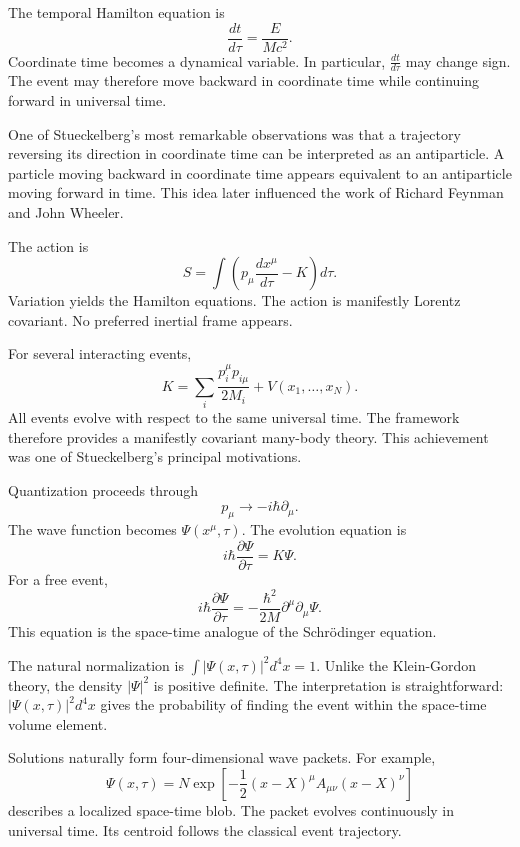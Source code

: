 The temporal Hamilton equation is
    \[\frac{dt}{d\tau} = \frac{E}{Mc^2}.\]
Coordinate time becomes a dynamical variable.
In particular, $\frac{dt}{d\tau}$ may change sign.
The event may therefore move backward in coordinate time while continuing 
forward in universal time.

One of Stueckelberg's most remarkable observations was that a trajectory 
reversing its direction in coordinate time can be interpreted as an antiparticle.
A particle moving backward in coordinate time appears equivalent to an 
antiparticle moving forward in time.
This idea later influenced the work of Richard Feynman and John Wheeler.

The action is
\begin{equation}
    \label{shp-a}
S=\int\left(p_\mu \frac{dx^\mu}{d\tau}-K\right)d\tau.
\end{equation}
Variation yields the Hamilton equations.
The action is manifestly Lorentz covariant.
No preferred inertial frame appears.

For several interacting events,
\begin{equation}
    \label{shp-hint}
K = \sum_i \frac{p_i^\mu p_{i\mu}}{2M_i}+V(x_1,\ldots,x_N).
\end{equation}
All events evolve with respect to the same universal time.
The framework therefore provides a manifestly covariant many-body theory.
This achievement was one of Stueckelberg's principal motivations.

Quantization proceeds through
 \[  p_\mu \rightarrow -i\hbar\partial_\mu.\]
The wave function becomes $  \Psi(x^\mu,\tau).$
The evolution equation is 
\[ i\hbar \frac{\partial\Psi}{\partial\tau}=K\Psi. \]
For a free event,
    \[i\hbar \frac{\partial\Psi}{\partial\tau}=-\frac{\hbar^2}{2M}\partial^\mu\partial_\mu\Psi.\]
This equation is the space-time analogue of the Schrödinger equation.

The natural normalization is
$\int |\Psi(x,\tau)|^2 d^4x = 1.$
Unlike the Klein-Gordon theory, the density $|\Psi|^2$
is positive definite.
The interpretation is straightforward:$|\Psi(x,\tau)|^2 d^4x$
gives the probability of finding the event within the space-time volume element.

Solutions naturally form four-dimensional wave packets.
For example,
\[
    \Psi(x,\tau) = N \exp \left[-\frac{1}{2}(x-X)^\mu A_{\mu\nu} (x-X)^\nu\right]
\]
describes a localized space-time blob.
The packet evolves continuously in universal time.
Its centroid follows the classical event trajectory.

